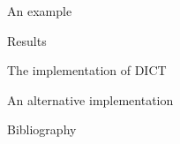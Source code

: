 \documentclass[12pt]{beamer}
\begin{document}
    \begin{frame}{An example}
    \end{frame}

    \begin{frame}{Results}
    \end{frame}

    \begin{frame}{The implementation of \textsc{DICT}}
    \end{frame}

    \begin{frame}{An alternative implementation}
    \end{frame}

    \begin{frame}{Bibliography}
	
        
    \end{frame}
\end{document}
